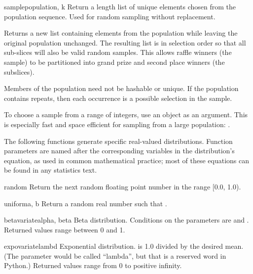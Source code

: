 \begin{funcdesc}{sample}{population, k}
  Return a  length list of unique elements chosen from the
  population sequence.  Used for random sampling without replacement.

  Returns a new list containing elements from the population while
  leaving the original population unchanged.  The resulting list is
  in selection order so that all sub-slices will also be valid random
  samples.  This allows raffle winners (the sample) to be partitioned
  into grand prize and second place winners (the subslices).

  Members of the population need not be hashable or unique.  If the
  population contains repeats, then each occurrence is a possible
  selection in the sample.

  To choose a sample from a range of integers, use an 
  object as an argument.  This is especially fast and space efficient for
  sampling from a large population:  .
\end{funcdesc}


The following functions generate specific real-valued distributions.
Function parameters are named after the corresponding variables in the
distribution's equation, as used in common mathematical practice; most of
these equations can be found in any statistics text.

\begin{funcdesc}{random}{}
  Return the next random floating point number in the range [0.0, 1.0).
\end{funcdesc}

\begin{funcdesc}{uniform}{a, b}
  Return a random real number  such that
  .
\end{funcdesc}

\begin{funcdesc}{betavariate}{alpha, beta}
  Beta distribution.  Conditions on the parameters are
   and .
  Returned values range between 0 and 1.
\end{funcdesc}

\begin{funcdesc}{expovariate}{lambd}
  Exponential distribution.   is 1.0 divided by the desired
  mean.  (The parameter would be called ``lambda'', but that is a
  reserved word in Python.)  Returned values range from 0 to
  positive infinity.
\end{funcdesc}

